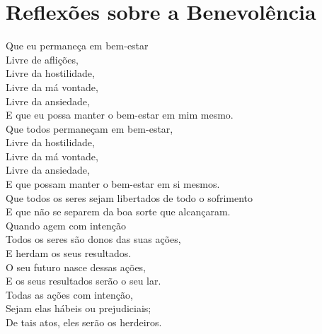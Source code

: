\chapter{Reflexões sobre a Benevolência}

Que eu permaneça em bem-estar\\
Livre de aflições,\\
Livre da hostilidade,\\
Livre da má vontade,\\
Livre da ansiedade,\\
E que eu possa manter o bem-estar em mim mesmo.\\
Que todos permaneçam em bem-estar,\\
Livre da hostilidade,\\
Livre da má vontade,\\
Livre da ansiedade,\\
E que possam manter o bem-estar em si mesmos.\\
Que todos os seres sejam libertados de todo o sofrimento\\
E que não se separem da boa sorte que alcançaram.\\
Quando agem com intenção\\
Todos os seres são donos das suas ações,\\
E herdam os seus resultados.\\
O seu futuro nasce dessas ações,\\
E os seus resultados serão o seu lar.\\
Todas as ações com intenção,\\
Sejam elas hábeis ou prejudiciais;\\
De tais atos, eles serão os herdeiros.

